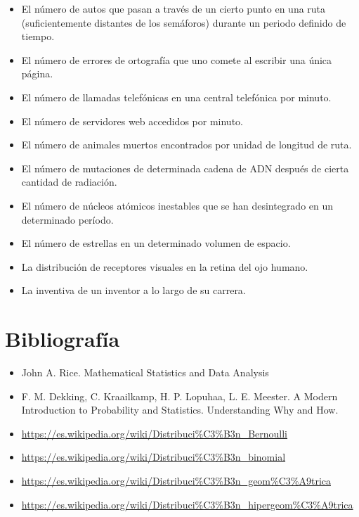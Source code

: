 \documentclass[]{book}
\providecommand{\tightlist}{%
  \setlength{\itemsep}{0pt}\setlength{\parskip}{0pt}}
\theoremstyle{plain}
\theoremstyle{definition}
\theoremstyle{definition} %
\begin{document}
\begin{itemize}
\tightlist
\item
  El número de autos que pasan a través de un cierto punto en una ruta
  (suficientemente distantes de los semáforos) durante un periodo
  definido de tiempo.
\item
  El número de errores de ortografía que uno comete al escribir una
  única página.
\item
  El número de llamadas telefónicas en una central telefónica por
  minuto.
\item
  El número de servidores web accedidos por minuto.
\item
  El número de animales muertos encontrados por unidad de longitud de
  ruta.
\item
  El número de mutaciones de determinada cadena de ADN después de cierta
  cantidad de radiación.
\item
  El número de núcleos atómicos inestables que se han desintegrado en un
  determinado período.
\item
  El número de estrellas en un determinado volumen de espacio.
\item
  La distribución de receptores visuales en la retina del ojo humano.
\item
  La inventiva de un inventor a lo largo de su carrera.
\end{itemize}

\hypertarget{bibliografuxeda}{%
\section{Bibliografía}\label{bibliografuxeda}}

\begin{itemize}
\tightlist
\item
  John A. Rice. Mathematical Statistics and Data Analysis
\item
  F. M. Dekking, C. Kraailkamp, H. P. Lopuhaa, L. E. Meester. A Modern
  Introduction to Probability and Statistics. Understanding Why and How.
\item
  \url{https://es.wikipedia.org/wiki/Distribuci\%C3\%B3n_Bernoulli}
\item
  \url{https://es.wikipedia.org/wiki/Distribuci\%C3\%B3n_binomial}
\item
  \url{https://es.wikipedia.org/wiki/Distribuci\%C3\%B3n_geom\%C3\%A9trica}
\item
  \url{https://es.wikipedia.org/wiki/Distribuci\%C3\%B3n_hipergeom\%C3\%A9trica}
\end{itemize}
\end{document}
